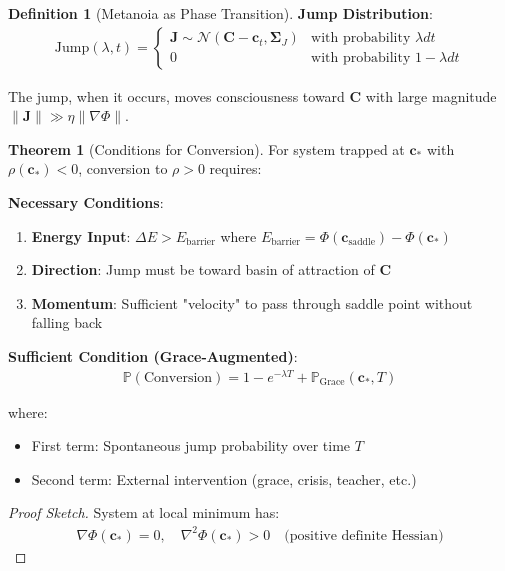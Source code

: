 \documentclass[11pt,a4paper]{article}
\theoremstyle{definition}
\newtheorem{definition}{Definition}[section]
\newtheorem{theorem}{Theorem}[section]
\theoremstyle{remark}
\newcommand{\cc}{\mathbf{c}}
\begin{document}
\begin{enumerate}
\begin{definition}[Metanoia as Phase Transition]
\textbf{Jump Distribution}:
\begin{align}
\text{Jump}(\lambda, t) = \begin{cases}
    \mathbf{J} \sim \mathcal{N}(\mathbf{C} - \cc_t, \boldsymbol{\Sigma}_J) & \text{with probability } \lambda dt \\
    0 & \text{with probability } 1 - \lambda dt
\end{cases}
\end{align}

The jump, when it occurs, moves consciousness toward \(\mathbf{C}\) with large magnitude \(\|\mathbf{J}\| \gg \eta \|\nabla \Phi\|\).
\end{definition}

\begin{theorem}[Conditions for Conversion]
For system trapped at \(\cc_*\) with \(\rho(\cc_*) < 0\), conversion to \(\rho > 0\) requires:

\textbf{Necessary Conditions}:
\begin{enumerate}
    \item \textbf{Energy Input}: \(\Delta E > E_{\text{barrier}}\) where \(E_{\text{barrier}} = \Phi(\cc_{\text{saddle}}) - \Phi(\cc_*)\)
    \item \textbf{Direction}: Jump must be toward basin of attraction of \(\mathbf{C}\)
    \item \textbf{Momentum}: Sufficient "velocity" to pass through saddle point without falling back
\end{enumerate}

\textbf{Sufficient Condition (Grace-Augmented)}:
\begin{align}
\mathbb{P}(\text{Conversion}) = 1 - e^{-\lambda T} + \mathbb{P}_{\text{Grace}}(\cc_*, T)
\end{align}

where:
\begin{itemize}
    \item First term: Spontaneous jump probability over time \(T\)
    \item Second term: External intervention (grace, crisis, teacher, etc.)
\end{itemize}
\end{theorem}

\begin{proof}[Proof Sketch]
System at local minimum has:
\begin{align}
\nabla \Phi(\cc_*) = 0, \quad \nabla^2 \Phi(\cc_*) > 0 \quad \text{(positive definite Hessian)}
\end{align}


\end{proof}
\end{enumerate}
\end{document}
